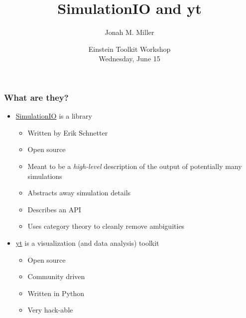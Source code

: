 \documentclass[]{beamer}
\title[SIO \& yt]{SimulationIO and yt}
\author[J. Miller]{Jonah M. Miller}
\institute[PI]{\color{blue}Perimeter Institute for Theoretical Physics}
\date[ET Workshop]{\color{black}Einstein Toolkit Workshop\\Wednesday, June 15}
\begin{document}
\begin{frame}[plain]
\titlepage
\end{frame}

\begin{frame}
  \frametitle{What are they?}
  \begin{itemize}
  \item {\color{blue}\href{https://github.com/eschnett/SimulationIO}{SimulationIO}} is a library
    \begin{itemize}
    \item Written by Erik Schnetter
    \item Open source
    \item Meant to be a \textit{high-level} description of the output of
      potentially many simulations
    \item Abstracts away simulation details
    \item Describes an API
    \item Uses category theory to cleanly remove ambiguities
    \end{itemize}
  \item {\color{blue}\href{http://yt-project.org/}{yt}} is a
    visualization (and data analysis) toolkit
    \begin{itemize}
    \item Open source
    \item Community driven
    \item Written in Python
    \item Very hack-able
    \end{itemize}
  \end{itemize}
\end{frame}
\end{document}
